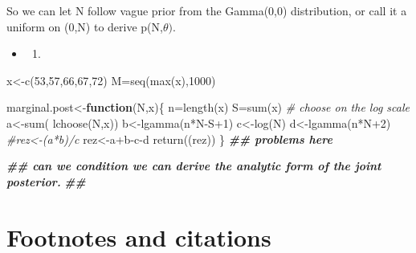 \documentclass[
]{book}
\newenvironment{Shaded}{\begin{snugshade}}{\end{snugshade}}
\newcommand{\CommentTok}[1]{\textcolor[rgb]{0.56,0.35,0.01}{\textit{#1}}}
\newcommand{\ControlFlowTok}[1]{\textcolor[rgb]{0.13,0.29,0.53}{\textbf{#1}}}
\newcommand{\DecValTok}[1]{\textcolor[rgb]{0.00,0.00,0.81}{#1}}
\newcommand{\DocumentationTok}[1]{\textcolor[rgb]{0.56,0.35,0.01}{\textbf{\textit{#1}}}}
\newcommand{\FunctionTok}[1]{\textcolor[rgb]{0.00,0.00,0.00}{#1}}
\newcommand{\NormalTok}[1]{#1}
\newcommand{\OtherTok}[1]{\textcolor[rgb]{0.56,0.35,0.01}{#1}}
\newcommand{\SpecialCharTok}[1]{\textcolor[rgb]{0.00,0.00,0.00}{#1}}
\providecommand{\tightlist}{%
  \setlength{\itemsep}{0pt}\setlength{\parskip}{0pt}}
\theoremstyle{definition}
\theoremstyle{definition}
\theoremstyle{definition}
\theoremstyle{definition}
\theoremstyle{remark}
\begin{document}
So we can let N follow vague prior from the Gamma(0,0) distribution, or call it a uniform on (0,N) to derive p(N,\(\theta)\).

\begin{itemize}
\item
  \begin{enumerate}
  \def\labelenumi{(\alph{enumi})}
  \setcounter{enumi}{1}
  \tightlist
  \item
  \end{enumerate}
\end{itemize}

\begin{Shaded}
\begin{Highlighting}[]
\NormalTok{ x}\OtherTok{\textless{}{-}}\FunctionTok{c}\NormalTok{(}\DecValTok{53}\NormalTok{,}\DecValTok{57}\NormalTok{,}\DecValTok{66}\NormalTok{,}\DecValTok{67}\NormalTok{,}\DecValTok{72}\NormalTok{)}
\NormalTok{ M}\OtherTok{=}\FunctionTok{seq}\NormalTok{(}\FunctionTok{max}\NormalTok{(x),}\DecValTok{1000}\NormalTok{)}
 
\NormalTok{ marginal.post}\OtherTok{\textless{}{-}}\ControlFlowTok{function}\NormalTok{(N,x)\{}
\NormalTok{   n}\OtherTok{=}\FunctionTok{length}\NormalTok{(x)}
\NormalTok{   S}\OtherTok{=}\FunctionTok{sum}\NormalTok{(x)}
   \CommentTok{\# choose on the log scale}
\NormalTok{   a}\OtherTok{\textless{}{-}}\FunctionTok{sum}\NormalTok{( }\FunctionTok{lchoose}\NormalTok{(N,x))}
\NormalTok{   b}\OtherTok{\textless{}{-}}\FunctionTok{lgamma}\NormalTok{(n}\SpecialCharTok{*}\NormalTok{N}\SpecialCharTok{{-}}\NormalTok{S}\SpecialCharTok{+}\DecValTok{1}\NormalTok{)}
\NormalTok{   c}\OtherTok{\textless{}{-}}\FunctionTok{log}\NormalTok{(N)}
\NormalTok{   d}\OtherTok{\textless{}{-}}\FunctionTok{lgamma}\NormalTok{(n}\SpecialCharTok{*}\NormalTok{N}\SpecialCharTok{+}\DecValTok{2}\NormalTok{)}
   \CommentTok{\#rez\textless{}{-}(a*b)/c}
\NormalTok{   rez}\OtherTok{\textless{}{-}}\NormalTok{a}\SpecialCharTok{+}\NormalTok{b}\SpecialCharTok{{-}}\NormalTok{c}\SpecialCharTok{{-}}\NormalTok{d}
   \FunctionTok{return}\NormalTok{((rez))}
\NormalTok{ \} }\DocumentationTok{\#\# problems here}
 
 \DocumentationTok{\#\# can we condition we can derive the analytic form of the joint posterior.}
 \DocumentationTok{\#\# }
\end{Highlighting}
\end{Shaded}

\hypertarget{footnotes-and-citations}{%
\chapter{Footnotes and citations}\label{footnotes-and-citations}}
\end{document}
